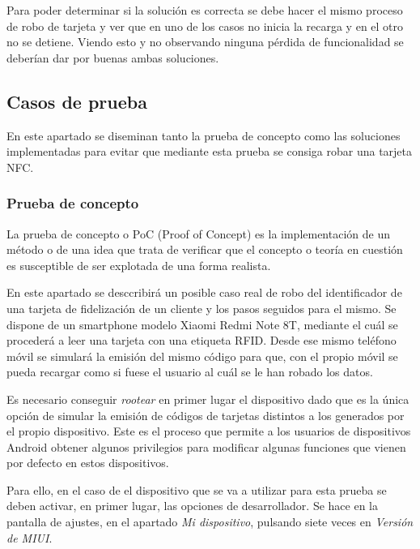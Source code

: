 \documentclass[12pt,a4paper,onecolumn,oneside]{report}
\begin{document}
Para poder determinar si la solución es correcta se debe hacer el mismo proceso de robo de tarjeta y ver que en uno de los casos no inicia la recarga y en el otro no se detiene. Viendo esto y no observando ninguna pérdida de funcionalidad se deberían dar por buenas ambas soluciones.

\subsection{Casos de prueba}

En este apartado se diseminan tanto la prueba de concepto como las soluciones implementadas para evitar que mediante esta prueba se consiga robar una tarjeta NFC.

\subsubsection{Prueba de concepto}
\label{Prueba de concepto}

La prueba de concepto o PoC (Proof of Concept) es la implementación de un método o de una idea que trata de verificar que el concepto o teoría en cuestión es susceptible de ser explotada de una forma realista.

En este apartado se desccribirá un posible caso real de robo del identificador de una tarjeta de fidelización de un cliente y los pasos seguidos para el mismo. Se dispone de un smartphone modelo Xiaomi Redmi Note 8T, mediante el cuál se procederá a leer una tarjeta con una etiqueta RFID. Desde ese mismo teléfono móvil se simulará la emisión del mismo código para que, con el propio móvil se pueda recargar como si fuese el usuario al cuál se le han robado los datos.

Es necesario conseguir \textit{rootear} en primer lugar el dispositivo dado que es la única opción de simular la emisión de códigos de tarjetas distintos a los generados por el propio dispositivo. Este es el proceso que permite a los usuarios de dispositivos Android obtener algunos privilegios para modificar algunas funciones que vienen por defecto en estos dispositivos.

Para ello, en el caso de el dispositivo que se va a utilizar para esta prueba se deben activar, en primer lugar, las opciones de desarrollador. Se hace en la pantalla de ajustes, en el apartado \textit{Mi dispositivo}, pulsando siete veces en \textit{Versión de MIUI}.
\end{document}
